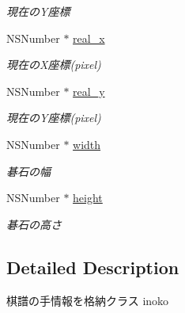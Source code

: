 \begin{DoxyCompactItemize}
\begin{DoxyCompactList}\small\item\em 現在のY座標 \end{DoxyCompactList}\item 
\hypertarget{interface_game_records_ae659b5bdfd2c5662ed4edbc43593eb90}{
NSNumber $\ast$ \hyperlink{interface_game_records_ae659b5bdfd2c5662ed4edbc43593eb90}{real\_\-x}}
\label{interface_game_records_ae659b5bdfd2c5662ed4edbc43593eb90}

\begin{DoxyCompactList}\small\item\em 現在のX座標(pixel) \end{DoxyCompactList}\item 
\hypertarget{interface_game_records_acfe802f54e8a19c2069c5e84c0eae38c}{
NSNumber $\ast$ \hyperlink{interface_game_records_acfe802f54e8a19c2069c5e84c0eae38c}{real\_\-y}}
\label{interface_game_records_acfe802f54e8a19c2069c5e84c0eae38c}

\begin{DoxyCompactList}\small\item\em 現在のY座標(pixel) \end{DoxyCompactList}\item 
\hypertarget{interface_game_records_af8f2b44d291b5d53214e9f35fe91ce77}{
NSNumber $\ast$ \hyperlink{interface_game_records_af8f2b44d291b5d53214e9f35fe91ce77}{width}}
\label{interface_game_records_af8f2b44d291b5d53214e9f35fe91ce77}

\begin{DoxyCompactList}\small\item\em 碁石の幅 \end{DoxyCompactList}\item 
\hypertarget{interface_game_records_a4fc7d57ec48774fb91242c2f00010946}{
NSNumber $\ast$ \hyperlink{interface_game_records_a4fc7d57ec48774fb91242c2f00010946}{height}}
\label{interface_game_records_a4fc7d57ec48774fb91242c2f00010946}

\begin{DoxyCompactList}\small\item\em 碁石の高さ \end{DoxyCompactList}\end{DoxyCompactItemize}


\subsection{Detailed Description}
棋譜の手情報を格納クラス  inoko 

